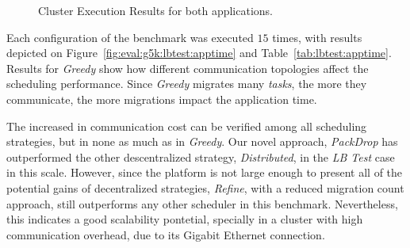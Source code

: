 \begin{figure}
	\centering
	\caption{Cluster Execution Results for both applications.}
	\label{fofinho3}
\end{figure}


Each configuration of the benchmark was executed $15$ times, with results depicted on Figure~\ref{fig:eval:g5k:lbtest:apptime} and Table~\ref{tab:lbtest:apptime}.
Results for \textit{Greedy} show how different communication topologies affect the scheduling performance.
Since \textit{Greedy} migrates many \textit{tasks}, the more they communicate, the more migrations impact the application time.

The increased in communication cost can be verified among all scheduling strategies, but in none as much as in \textit{Greedy}.
Our novel approach, \textit{PackDrop} has outperformed the other descentralized strategy, \textit{Distributed}, in the \textit{LB Test} case in this scale.
However, since the platform is not large enough to present all of the potential gains of decentralized strategies, \textit{Refine}, with a reduced migration count approach, still outperforms any other scheduler in this benchmark.
Nevertheless, this indicates a good scalability pontetial, specially in a cluster with high communication overhead, due to its Gigabit Ethernet connection.


